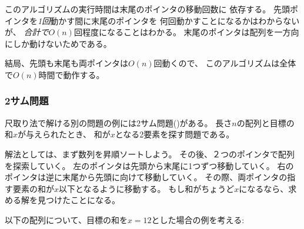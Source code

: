 このアルゴリズムの実行時間は末尾のポインタの移動回数に
依存する。
先頭ポインタを\emph{1回}動かす間に末尾のポインタを
何回動かすことになるかはわからないが、
\emph{合計で}$O(n)$回程度になることはわかる。
末尾のポインタは配列を一方向にしか動けないためである。

結局、先頭も末尾も両ポインタは$O(n)$回動くので、
このアルゴリズムは全体で$O(n)$時間で動作する。

\begin{comment}
\subsubsection{2SUM problem}

\index{2SUM problem}

Another problem that can be solved using
the two pointers method is the following problem,
also known as the \key{2SUM problem}:
given an array of $n$ numbers and
a target sum $x$, find
two array values such that their sum is $x$,
or report that no such values exist.

To solve the problem, we first
sort the array values in increasing order.
After that, we iterate through the array using
two pointers.
The left pointer starts at the first value
and moves one step to the right on each turn.
The right pointer begins at the last value
and always moves to the left until the sum of the
left and right value is at most $x$.
If the sum is exactly $x$,
a solution has been found.

For example, consider the following array
and a target sum $x=12$:
\end{comment}

\subsubsection{2サム問題}


尺取り法で解ける別の問題の例には2サム問題()がある。
長さ$n$の配列と目標の和$x$が与えられたとき、
和が$x$となる2要素を探す問題である。

解法としては、まず数列を昇順ソートしよう。
その後、２つのポインタで配列を探索していく。
左のポインタは先頭から末尾に1つずつ移動していく。
右のポインタは逆に末尾から先頭に向けて移動していく。
その際、両ポインタの指す要素の和が$x$以下となるように移動する。
もし和がちょうど$x$になるなら、求める解を見つけたことになる。

以下の配列について、目標の和を$x=12$とした場合の例を考える:

